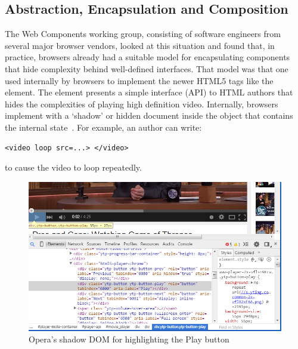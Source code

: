 \subsection{Abstraction, Encapsulation and Composition}

The Web Components working group, consisting of software engineers from several major browser vendors, 
looked at this situation and found that, in practice, browsers already had a suitable model for encapsulating components that hide complexity behind well-defined interfaces.
That model was that one used internally by browsers to implement the newer 
HTML5 tags 
like the \textbf{} element. 
The  element presents a simple interface (API) to HTML authors that hides the complexities of playing high definition video.
Internally, browsers implement  with a `shadow' or hidden document inside the object that contains the internal state~\cite{kitamura2014}. 
For example, an author can write:
\begin{lstlisting}[language=HTML5,numbers=none]
	<video loop src=...> </video>
\end{lstlisting}
to cause the video to loop repeatedly.

\begin{figure}[htb]
\centerline{\includegraphics[width=6in]{images/html5_video_control.png}} 
\caption{Opera's shadow DOM for  highlighting the Play button}
\label{f:html5video}
\end{figure}


